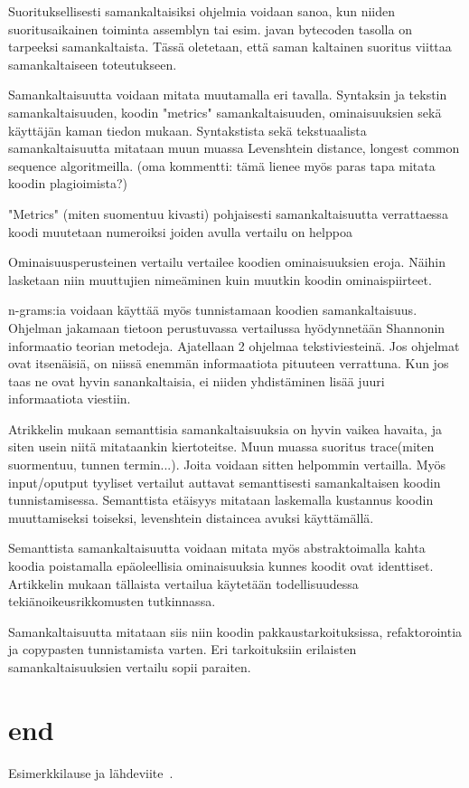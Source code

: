 \documentclass[finnish]{tktltiki2}
\theoremstyle{definition}
\theoremstyle{remark}
\begin{document}
Suorituksellisesti samankaltaisiksi ohjelmia voidaan sanoa, kun niiden suoritusaikainen toiminta assemblyn tai esim. javan bytecoden tasolla on tarpeeksi samankaltaista. Tässä oletetaan, että saman kaltainen suoritus viittaa samankaltaiseen toteutukseen.


Samankaltaisuutta voidaan mitata muutamalla eri tavalla. Syntaksin ja tekstin samankaltaisuuden, koodin "metrics" samankaltaisuuden, ominaisuuksien  sekä käyttäjän kaman tiedon mukaan.
Syntakstista sekä tekstuaalista samankaltaisuutta mitataan muun muassa Levenshtein distance, longest common sequence algoritmeilla. (oma kommentti: tämä lienee myös paras tapa mitata koodin plagioimista?)

"Metrics" (miten suomentuu kivasti) pohjaisesti samankaltaisuutta verrattaessa koodi muutetaan numeroiksi joiden avulla vertailu on helppoa

Ominaisuusperusteinen vertailu vertailee koodien ominaisuuksien eroja. Näihin lasketaan niin muuttujien nimeäminen kuin muutkin koodin ominaispiirteet.

n-grams:ia voidaan käyttää myös tunnistamaan koodien samankaltaisuus.
Ohjelman jakamaan tietoon perustuvassa vertailussa hyödynnetään Shannonin informaatio teorian metodeja. Ajatellaan 2 ohjelmaa tekstiviesteinä. Jos ohjelmat ovat itsenäisiä, on niissä enemmän informaatiota pituuteen verrattuna. Kun jos taas ne ovat hyvin sanankaltaisia, ei niiden yhdistäminen lisää juuri informaatiota viestiin.


Atrikkelin mukaan semanttisia samankaltaisuuksia on hyvin vaikea havaita, ja siten usein niitä mitataankin kiertoteitse. Muun muassa suoritus trace(miten suormentuu, tunnen termin...). Joita voidaan sitten helpommin vertailla. Myös input/oputput tyyliset vertailut auttavat semanttisesti samankaltaisen koodin tunnistamisessa. Semanttista etäisyys mitataan laskemalla kustannus koodin muuttamiseksi toiseksi, levenshtein distaincea avuksi käyttämällä.

Semanttista samankaltaisuutta voidaan mitata myös abstraktoimalla kahta koodia poistamalla epäoleellisia ominaisuuksia kunnes koodit ovat identtiset. Artikkelin mukaan tällaista vertailua käytetään todellisuudessa tekiänoikeusrikkomusten tutkinnassa.

Samankaltaisuutta mitataan siis niin koodin pakkaustarkoituksissa, refaktorointia ja copypasten tunnistamista varten. Eri tarkoituksiin erilaisten samankaltaisuuksien vertailu sopii paraiten. 


\section{end}
Esimerkkilause ja lähdeviite~\cite{esimerkki}.
\end{document}
